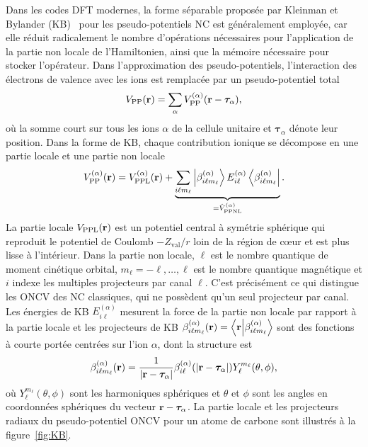 Dans les codes DFT modernes, la forme séparable proposée par Kleinman et Bylander (KB)~\cite{kleinmanEfficaciousFormModel1982} pour les pseudo-potentiels NC est généralement employée, car elle réduit radicalement le nombre d'opérations nécessaires pour l'application de la partie non locale de l'Hamiltonien, ainsi que la mémoire nécessaire pour stocker l'opérateur. Dans l'approximation des pseudo-potentiels, l'interaction des électrons de valence avec les ions est remplacée par un pseudo-potentiel total
\begin{equation}
    V_\text{PP}(\mathbf{r})=\sum_\alpha V_\text{PP}^{(\alpha)}(\mathbf{r}-\bm{\tau}_\alpha),
    \label{eqn:c2_pp_approx}
\end{equation}
où la somme court sur tous les ions $\alpha$ de la cellule unitaire et $\bm{\tau}_\alpha$ dénote leur position. Dans la forme de KB, chaque contribution ionique se décompose en une partie locale et une partie non locale
\begin{equation}
    V^{(\alpha)}_\text{PP}(\mathbf{r}) = V^{(\alpha)}_\text{PPL}(\mathbf{r})+\underbrace{\sum_{i\ell m_\ell}\ket{\beta_{i\ell m_\ell}^{(\alpha)}}E_{i\ell}^{(\alpha)}\bra{\beta_{i\ell m_\ell}^{(\alpha)}}}_{=\hat{V}_\text{PPNL}^{(\alpha)}}.
    \label{eqn:c2_VKB}
\end{equation}
La partie locale $V_\text{PPL}(\mathbf{r})$ est un potentiel central à symétrie sphérique qui reproduit le potentiel de Coulomb $-Z_\text{val}/r$ loin de la région de c\oe ur et est plus lisse à l'intérieur. Dans la partie non locale, $\ell$ est le nombre quantique de moment cinétique orbital, $m_\ell=-\ell,\dots,\ell$ est le nombre quantique magnétique et $i$ indexe les multiples projecteurs par canal $\ell$. C'est précisément ce qui distingue les ONCV des NC classiques, qui ne possèdent qu'un seul projecteur par canal. Les énergies de KB $E_{i\ell}^{(\alpha)}$ mesurent la force de la partie non locale par rapport à la partie locale et les projecteurs de KB $\beta_{i\ell m_\ell}^{(\alpha)}(\mathbf{r})=\braket{\mathbf{r}}{\beta_{i\ell m_\ell}^{(\alpha)}}$ sont des fonctions à courte portée centrées sur l'ion $\alpha$, dont la structure est
\begin{equation}
    \beta_{i\ell m_\ell}^{(\alpha)}(\mathbf{r})=\frac{1}{|\mathbf{r}-\bm{\tau}_\alpha|}\beta_{i\ell}^{(\alpha)}(|\mathbf{r}-\bm{\tau}_\alpha|)Y_{\ell}^{m_\ell}(\theta,\phi),
    \label{eqn:betar}
\end{equation}
où $Y_\ell^{m_\ell}(\theta, \phi)$ sont les harmoniques sphériques et $\theta$ et $\phi$ sont les angles en coordonnées sphériques du vecteur $\mathbf{r}-\bm{\tau}_\alpha$. La partie locale et les projecteurs radiaux du pseudo-potentiel ONCV pour un atome de carbone sont illustrés à la figure~\ref{fig:KB}.

